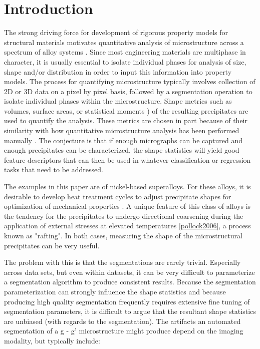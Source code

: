 \documentclass[review]{elsarticle}
\begin{document}
	\section{Introduction}
		The strong driving force for development of rigorous property models for structural materials motivates quantitative analysis of microstructure across a spectrum of alloy systems \cite{echlinlenthe}. Since most engineering materials are multiphase in character, it is usually essential to isolate individual phases for analysis of size, shape and/or distribution in order to input this information into property models. The process for quantifying microstructure typically involves collection of 2D or 3D data on a pixel by pixel basis, followed by a segmentation operation to isolate individual phases within the microstructure. Shape metrics such as volumes, surface areas, or statistical moments \cite{twoDM, threeDM}) of the resulting precipitates are used to quantify the analysis. These metrics are chosen in part because of their similarity with how quantitative microstructure analysis has been performed manually \cite{sluytman, underwood}. The conjecture is that if enough micrographs can be captured and enough precipitates can be characterized, the shape statistics will yield good feature descriptors that can then be used in whatever classification or regression tasks that need to be addressed.
		
		The examples in this paper are of nickel-based superalloys. For these alloys, it is desirable to develop heat treatment cycles to adjust precipitate shapes for optimization of mechanical properties \cite{sluytman}. A unique feature of this class of alloys is the tendency for the precipitates to undergo directional coarsening during the application of external stresses at elevated temperatures \ref{pollock2006}, a process known as "rafting". In both cases, measuring the shape of the microstructural precipitates can be very useful.

		The problem with this is that the segmentations are rarely trivial. Especially across data sets, but even within datasets, it can be very difficult to parameterize a segmentation algorithm to produce consistent results. Because the segmentation parameterization can strongly influence the shape statistics and because producing high quality segmentation frequently requires extensive fine tuning of segmentation parameters, it is difficult to argue that the resultant shape statistics are unbiased (with regards to the segmentation). The artifacts an automated segmentation of a g - g' microstructure might produce depend on the imaging modality, but typically include:
\end{document}
